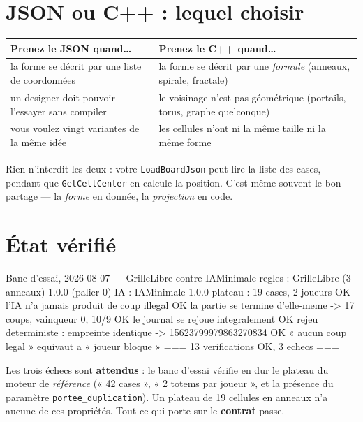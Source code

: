 \section{JSON ou C++ : lequel choisir}

\begin{center}
\begin{tabular}{@{}p{6.4cm}p{7.4cm}@{}}
\toprule
\textbf{Prenez le JSON quand\ldots} & \textbf{Prenez le C++ quand\ldots} \\
\midrule
la forme se décrit par une liste de coordonnées & la forme se décrit par une
  \emph{formule} (anneaux, spirale, fractale) \\
un designer doit pouvoir l'essayer sans compiler & le voisinage n'est pas
  géométrique (portails, torus, graphe quelconque) \\
vous voulez vingt variantes de la même idée & les cellules n'ont ni la même
  taille ni la même forme \\
\bottomrule
\end{tabular}
\end{center}

Rien n'interdit les deux : votre \texttt{LoadBoardJson} peut lire la liste des
cases, pendant que \texttt{GetCellCenter} en calcule la position. C'est même
souvent le bon partage — la \emph{forme} en donnée, la \emph{projection} en code.

\section{État vérifié}

\begin{nkcode}{Banc d'essai, 2026-08-07 — GrilleLibre contre IAMinimale}
       regles : GrilleLibre (3 anneaux) 1.0.0 (palier 0)
       IA     : IAMinimale 1.0.0
       plateau : 19 cases, 2 joueurs
  OK   l'IA n'a jamais produit de coup illegal
  OK   la partie se termine d'elle-meme        -> 17 coups, vainqueur 0, 10/9
  OK   le journal se rejoue integralement
  OK   rejeu deterministe : empreinte identique -> 15623799979863270834
  OK   « aucun coup legal » equivaut a « joueur bloque »
=== 13 verifications OK, 3 echecs ===
\end{nkcode}

Les trois échecs sont \textbf{attendus} : le banc d'essai vérifie en dur le
plateau du moteur de \emph{référence} (« 42 cases », « 2 totems par joueur », et
la présence du paramètre \texttt{portee\_duplication}). Un plateau de 19 cellules
en anneaux n'a aucune de ces propriétés. Tout ce qui porte sur le \textbf{contrat}
passe.

